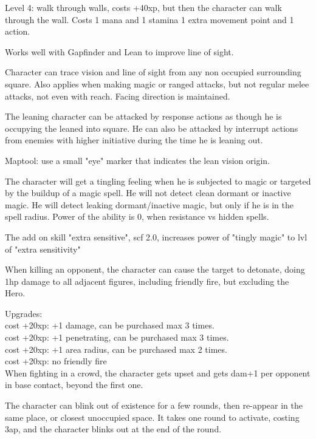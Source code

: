 Level 4: walk through walls, costs +40xp, but then the character can walk through the wall. Costs 1 mana and 1 stamina 1 extra movement point and 1 action.

Works well with Gapfinder and Lean to improve line of sight.


 Character can trace vision and line of sight from any non occupied surrounding square. Also applies when making magic or ranged attacks, but not regular melee attacks, not even with reach. Facing direction is maintained.

The leaning character can be attacked by response actions as though he is occupying the leaned into square. He can also be attacked by interrupt actions from enemies with higher initiative during the time he is leaning out.

Maptool: use a small "eye" marker that indicates the lean vision origin.


 The character will get a tingling feeling when he is subjected to magic or targeted by the buildup of a magic spell. He will not detect clean dormant or inactive magic. He will detect leaking dormant/inactive magic, but only if he is in the spell radius.
Power of the ability is 0, when resistance vs hidden spells.

The add on skill "extra sensitive", scf 2.0, increases power of "tingly magic" to lvl of "extra sensitivity"


 When killing an opponent, the character can cause the target to detonate, doing 1hp damage to all adjacent figures, including friendly fire, but excluding the Hero.

Upgrades:\\
cost +20xp: +1 damage, can be purchased max 3 times. \\
cost +20xp: +1 penetrating, can be purchased max 3 times. \\
cost +20xp: +1 area radius, can be purchased max 2 times. \\
cost +20xp: no friendly fire \\


 When fighting in a crowd, the character gets upset and gets dam+1 per opponent in base contact, beyond the first one.


 The character can blink out of existence for a few rounds, then re-appear in the same place, or closest unoccupied space. It takes one round to activate, costing 3ap, and the character blinks out at the end of the round.

